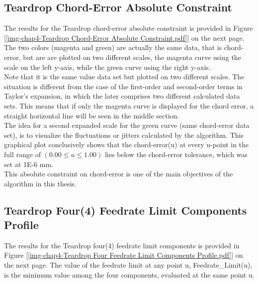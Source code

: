 \clearpage
\pagebreak

\subsection{Teardrop Chord-Error Absolute Constraint} 
\label{ssec-chap4-Teardrop Chord-Error Absolute Constraint}

The results for the Teardrop chord-error absolute constraint is provided in Figure [\ref{img-chap4-Teardrop Chord-Error Absolute Constraint.pdf}] on the next page. The two colors (magenta and green) are actually the same data, that is chord-error, but are are plotted on two different scales, the magenta curve using the scale on the left y-axis, while the green curve using the right y-axis. \\

Note that it is the same value data set but plotted on two different scales. The situation is different from the case of the first-order and second-order terms in Taylor's expansion, in which the later comprises two different calculated data sets. This means that if only the magenta curve is displayed for the chord error, a straight horizontal line will be seen in the middle section. \\

The idea for a second expanded scale for the green curve (same chord-error data set), is to visualize the fluctuations or jitters calculated by the algorithm. This graphical plot conclusively shows that the chord-error(u) at every u-point in the full range of $(0.00 \le u \le 1.00)$ lies below the chord-error tolerance, which was set at 1E-6 mm.\\ 

This absolute constraint on chord-error is one of the main objectives of the algorithm in this thesis.


\subsection{Teardrop Four(4) Feedrate Limit Components Profile}
\label{ssec-chap4-Teardrop Four Feedrate Limit Components Profile}

The results for the Teardrop four(4) feedrate limit components is provided in Figure [\ref{img-chap4-Teardrop Four Feedrate Limit Components Profile.pdf}] on the next page. The value of the feedrate limit at any point u, Feedrate\_Limit(u), is the minimum value among the four components, evaluated at the same point u. \\

